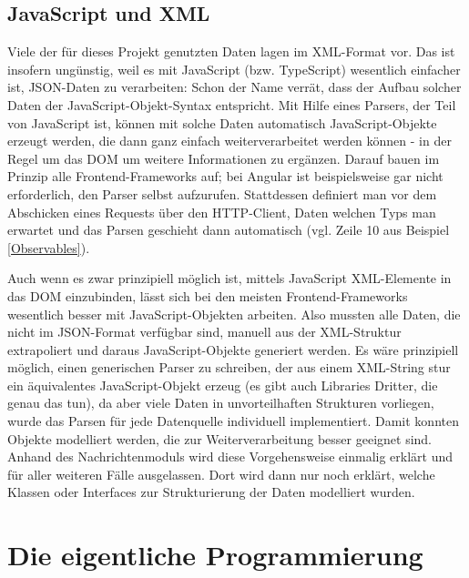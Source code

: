 \subsection{JavaScript und XML}
\label{sec:prog:special:JsXml}
Viele der für dieses Projekt genutzten Daten lagen im XML-Format vor. Das ist insofern ungünstig, weil es mit JavaScript (bzw. TypeScript) wesentlich einfacher ist, \acs{JSON}-Daten zu verarbeiten: Schon der Name verrät, dass der Aufbau solcher Daten der JavaScript-Objekt-Syntax entspricht. Mit Hilfe eines Parsers, der Teil von JavaScript ist, können mit solche Daten automatisch JavaScript-Objekte erzeugt werden, die dann ganz einfach weiterverarbeitet werden können - in der Regel um das DOM um weitere Informationen zu ergänzen. Darauf bauen im Prinzip alle Frontend-Frameworks auf; bei Angular ist beispielsweise gar nicht erforderlich, den Parser selbst aufzurufen. Stattdessen definiert man vor dem Abschicken eines Requests über den \acs{HTTP}-Client, Daten welchen Typs man erwartet und das Parsen geschieht dann automatisch (vgl. Zeile 10 aus Beispiel \ref{Observables}).

Auch wenn es zwar prinzipiell möglich ist, mittels JavaScript XML-Elemente in das DOM einzubinden, lässt sich bei den meisten Frontend-Frameworks wesentlich besser mit JavaScript-Objekten arbeiten. Also mussten alle Daten, die nicht im \acs{JSON}-Format verfügbar sind, manuell aus der \acs{XML}-Struktur extrapoliert und daraus JavaScript-Objekte generiert werden. Es wäre prinzipiell möglich, einen generischen Parser zu schreiben, der aus einem \acs{XML}-String stur ein äquivalentes JavaScript-Objekt erzeug (es gibt auch Libraries Dritter, die genau das tun), da aber viele Daten in unvorteilhaften Strukturen vorliegen, wurde das Parsen für jede Datenquelle individuell implementiert. Damit konnten Objekte modelliert werden, die zur Weiterverarbeitung besser geeignet sind. Anhand des Nachrichtenmoduls wird diese Vorgehensweise einmalig erklärt und für aller weiteren Fälle ausgelassen. Dort wird dann nur noch erklärt, welche Klassen oder Interfaces zur Strukturierung der Daten modelliert wurden.

\section{Die eigentliche Programmierung}

